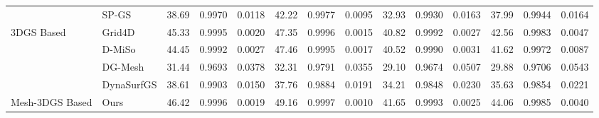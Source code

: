 \begin{table}[t]
{\begin{tabular}{@{}llcccccccccccc@{}}
 & SP-GS & 38.69 & 0.9970 & 0.0118 & 42.22 & 0.9977 & 0.0095 & 32.93 & 0.9930 & 0.0163 & 37.99 & 0.9944 & 0.0164 \\
\multirow{-5}{*}{3DGS Based} & Grid4D & \cellcolor[HTML]{FAC791}45.33 & \cellcolor[HTML]{FAC791}0.9995 & \cellcolor[HTML]{FAC791}0.0020 & 47.35 & \cellcolor[HTML]{FAC791}0.9996 & \cellcolor[HTML]{FAC791}0.0015 & \cellcolor[HTML]{FFFF8F}40.82 & \cellcolor[HTML]{FAC791}0.9992 & \cellcolor[HTML]{FAC791}0.0027 & \cellcolor[HTML]{FFFF8F}42.56 & \cellcolor[HTML]{FAC791}0.9983 & \cellcolor[HTML]{FAC791}0.0047 \\ \cmidrule(lr){2-2}
 & D-MiSo & 44.45 & \cellcolor[HTML]{FFFF8F}0.9992 & \cellcolor[HTML]{FFFF8F}0.0027 & \cellcolor[HTML]{FFFF8F}47.46 & \cellcolor[HTML]{FFFF8F}0.9995 & \cellcolor[HTML]{FFFF8F}0.0017 & 40.52 & \cellcolor[HTML]{FFFF8F}0.9990 & \cellcolor[HTML]{FFFF8F}0.0031 & 41.62 & 0.9972 & 0.0087 \\
 & DG-Mesh & 31.44 & 0.9693 & 0.0378 & 32.31 & 0.9791 & 0.0355 & 29.10 & 0.9674 & 0.0507 & 29.88 & 0.9706 & 0.0543 \\
 & DynaSurfGS & 38.61 & 0.9903 & 0.0150 & 37.76 & 0.9884 & 0.0191 & 34.21 & 0.9848 & 0.0230 & 35.63 & 0.9854 & 0.0221 \\
\multirow{-4}{*}{Mesh-3DGS Based} & Ours & \cellcolor[HTML]{F59194}46.42 & \cellcolor[HTML]{F59194}0.9996 & \cellcolor[HTML]{F59194}0.0019 & \cellcolor[HTML]{F59194}49.16 & \cellcolor[HTML]{F59194}0.9997 & \cellcolor[HTML]{F59194}0.0010 & \cellcolor[HTML]{F59194}41.65 & \cellcolor[HTML]{F59194}0.9993 & \cellcolor[HTML]{F59194}0.0025 & \cellcolor[HTML]{F59194}44.06 & \cellcolor[HTML]{F59194}0.9985 & \cellcolor[HTML]{F59194}0.0040 \\ \midrule
\end{tabular}%
}
\vspace{-10pt}
\end{table}


